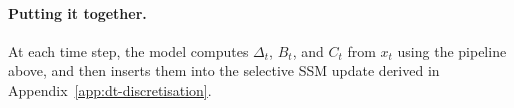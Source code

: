 \documentclass[a4paper,11pt]{article}
\begin{document}
\paragraph{Putting it together.}
At each time step, the model computes $\Delta_t$, $B_t$, and $C_t$ from $x_t$ using the pipeline above, and then inserts them into the selective SSM update derived in Appendix~\ref{app:dt-discretisation}.










 

\end{document}
